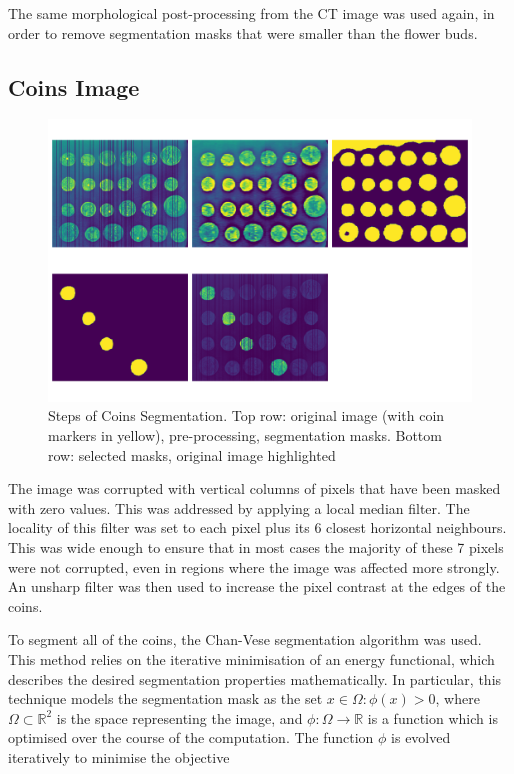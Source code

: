 \documentclass[12pt]{article}
\begin{document}
The same morphological post-processing from the CT image was used again,
in order to remove segmentation masks that were smaller than the flower buds.

\subsection{Coins Image}

\begin{figure}[htp]
    \includegraphics[scale=0.35, center]{figures/coins_segmentation.png}
    \caption{Steps of Coins Segmentation. Top row: original image (with coin markers in yellow), pre-processing, segmentation masks. Bottom row: selected masks, original image highlighted}
    \label{fig:coins}
\end{figure}

The image was corrupted with vertical columns of pixels that have been masked with zero values.
This was addressed by applying a local median filter.
The locality of this filter was set to each pixel plus its 6 closest horizontal neighbours.
This was wide enough to ensure that in most cases the majority of these 7 pixels were not corrupted,
even in regions where the image was affected more strongly.
An unsharp filter was then used to increase the pixel contrast at the edges of the coins.

To segment all of the coins, the Chan-Vese \cite{chanvese} segmentation algorithm was used.
This method relies on the iterative minimisation of an energy functional,
which describes the desired segmentation properties mathematically.
In particular, this technique models the segmentation mask as the set ${x\in\Omega:\phi(x)>0}$,
where $\Omega\subset\mathbb{R}^2$ is the space representing the image,
and $\phi:\Omega\rightarrow\mathbb{R}$ is a function which is optimised over the course of the computation.
The function $\phi$ is evolved iteratively to minimise the objective \cite{chanvese}
\end{document}
